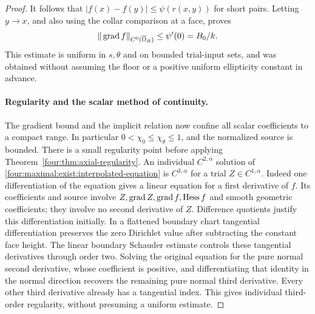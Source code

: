 \begin{proof}
It follows that $|f(x)-f(y)|\le\psi(r(x,y))$ for short pairs.  Letting
$y\to x$, and also using the collar comparison at a face, proves
\begin{equation}\label{four:maximal:exist:scalar-gradient}
 \|\operatorname{grad} f\|_{C^0(\overline\Omega_R)}\le\psi'(0)=B_0/k.
\end{equation}
This estimate is uniform in $s,\theta$ and on bounded trial-input sets,
and was obtained without assuming the floor or a positive uniform
ellipticity constant in advance.

\paragraph{Regularity and the scalar method of continuity.}
The gradient bound and the implicit relation now confine all scalar
coefficients to a compact range.  In particular
$0<\chi_0\le\chi_\theta\le1$, and the normalized source is bounded.
There is a small regularity point before applying
Theorem~\ref{four:thm:axial-regularity}.  An individual
$C^{2,\alpha}$ solution of \eqref{four:maximal:exist:interpolated-equation} is
$C^{3,\alpha}$ for a trial $Z\in C^{1,\alpha}$.
Indeed one differentiation of the equation gives a linear equation
for a first derivative of $f$.  Its coefficients and source involve
$Z,\operatorname{grad} Z,\operatorname{grad} f,\operatorname{Hess} f$ and smooth geometric coefficients;
they involve no second derivative of $Z$.
Difference quotients justify this differentiation initially.
In a flattened boundary chart tangential differentiation preserves
the zero Dirichlet value after subtracting the constant face height.
The linear boundary Schauder estimate controls these tangential
derivatives through order two.  Solving the original equation for
the pure normal second derivative, whose coefficient is positive,
and differentiating that identity in the normal direction recovers
the remaining pure normal third derivative.  Every other third
derivative already has a tangential index.  This gives individual
third-order regularity, without presuming a uniform estimate.


\end{proof}
